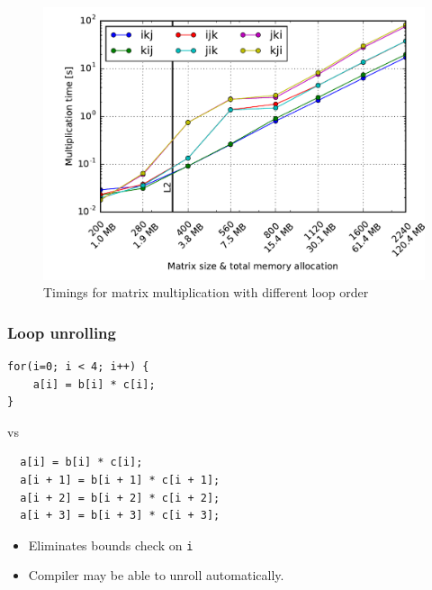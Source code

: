 \documentclass[usenames,dvipsnames,mathserif,compress]{beamer}
\begin{document}
\begin{frame}
  \begin{figure}
  \includegraphics[width=\textwidth]{code/timings-matmul}
  \caption{Timings for matrix multiplication with different loop order}
  \end{figure}
\end{frame}


\begin{frame}[fragile]
  \frametitle{Loop unrolling}
\begin{lstlisting}
for(i=0; i < 4; i++) {
    a[i] = b[i] * c[i];
}
\end{lstlisting}
vs
\begin{lstlisting}
  a[i] = b[i] * c[i];
  a[i + 1] = b[i + 1] * c[i + 1];
  a[i + 2] = b[i + 2] * c[i + 2];
  a[i + 3] = b[i + 3] * c[i + 3];
\end{lstlisting}
\begin{itemize}
\item Eliminates bounds check on \texttt{i}
\item Compiler may be able to unroll automatically.
\end{itemize}
\end{frame}
\end{document}
